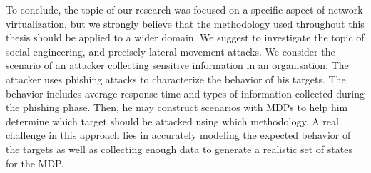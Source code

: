 To conclude, the topic of our research was focused on a specific aspect of network virtualization, but we strongly believe that the methodology used throughout this thesis should be applied to a wider domain. We suggest to investigate the topic of social engineering, and precisely lateral movement attacks. We consider the scenario of an attacker collecting sensitive information in an organisation. The attacker uses phishing attacks to characterize the behavior of his targets. The behavior includes average response time and types of information collected during the phishing phase. Then, he may construct scenarios with MDPs to help him determine which target should be attacked using which methodology. 
A real challenge in this approach lies in accurately modeling the expected behavior of the targets as well as collecting enough data to generate a realistic set of states for the MDP.